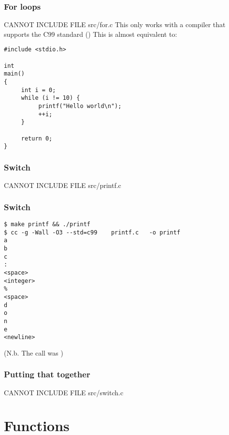 \documentclass[10pt, t]{beamer}
\begin{document}
\begin{frame}[fragile]
\frametitle{For loops}
\label{sec-2_1_3}

CANNOT INCLUDE FILE src/for.c
This only works with a compiler that supports the C99 standard ()
\pause
This is almost equivalent to:
\begin{verbatim}
#include <stdio.h>

int
main()
{
     int i = 0;
     while (i != 10) {
          printf("Hello world\n");
          ++i;
     }

     return 0;
}
\end{verbatim}
\end{frame}
\begin{frame}[allowframebreaks]
\frametitle{Switch}
\label{sec-2_1_4}

CANNOT INCLUDE FILE src/printf.c
\end{frame}
\begin{frame}[fragile]
\frametitle{Switch}
\label{sec-2_1_5}

\begin{verbatim}
$ make printf && ./printf
$ cc -g -Wall -O3 --std=c99    printf.c   -o printf
a
b
c
:
<space>
<integer>
%
<space>
d
o
n
e
<newline>
\end{verbatim}
(N.b. The call was )
\end{frame}
\begin{frame}
\frametitle{Putting that together}
\label{sec-2_1_6}

CANNOT INCLUDE FILE src/switch.c
\end{frame}
\section{Functions}
\label{sec-3}
\end{document}
